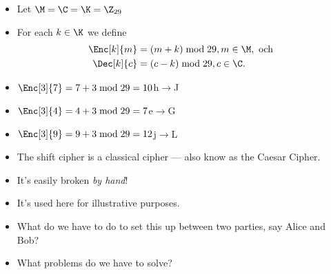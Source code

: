 \begin{frame}
  \begin{definition}\label{ShiftCipher}
    \begin{itemize}
      \item Let \(\M = \C = \K = \Z_{29}\)
      \item For each \(k\in \K\) we define
        \begin{align}
          \nonumber
          \Enc[k]{m} &= (m + k) \bmod 29, m\in \M, \text{\ och } \\
          \nonumber
          \Dec[k]{c} &= (c - k) \bmod 29, c\in \C.
        \end{align}
    \end{itemize}
  \end{definition}

  \pause{}

  \begin{example}
    \begin{itemize}
      \item \(\Enc[3]{7} = 7+3 \bmod 29 = 10\)\hfill h\(\to\)J
      \item \(\Enc[3]{4} = 4+3 \bmod 29 = 7\)\hfill e\(\to\)G
      \item \(\Enc[3]{9} = 9+3 \bmod 29 = 12\)\hfill j\(\to\)L
    \end{itemize}
  \end{example}
\end{frame}

\begin{frame}
  \begin{remark}
    \begin{itemize}
      \item The shift cipher is a classical cipher --- also know as the Caesar 
        Cipher.
      \item It's easily broken \emph{by hand}!
      \item It's used here for illustrative purposes.
    \end{itemize}
  \end{remark}
\end{frame}

\begin{frame}
  \begin{exercise}
    \begin{itemize}
      \item What do we have to do to set this up between two parties, say Alice 
        and Bob?
      \item What problems do we have to solve?
    \end{itemize}
  \end{exercise}
\end{frame}

